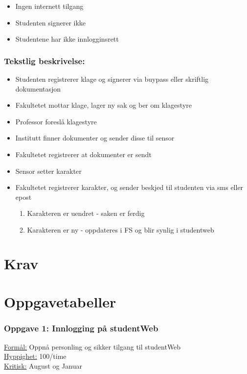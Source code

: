 \documentclass[12pt]{article}
\begin{document}
\begin{itemize}
\item Ingen internett tilgang
\item Studenten signerer ikke
\item Studentene har ikke innlogginsrett
\end{itemize}

\subsubsection*{Tekstlig beskrivelse:}

\begin{itemize}
\item Studenten registrerer klage og signerer via buypass eller skriftlig dokumentasjon
\item Fakultetet mottar klage, lager ny sak og ber om klagestyre
\item Professor foreslå klagestyre
\item Institutt finner dokumenter og sender disse til sensor
\item Fakultetet registrerer at dokumenter er sendt
\item Sensor setter karakter
\item Fakultetet registrerer karakter, og sender beskjed til studenten via sms eller epost
\begin{enumerate}
\item Karakteren er uendret - saken er ferdig
\item Karakteren er ny - oppdateres i FS og blir synlig i studentweb
\end{enumerate}
\end{itemize}


\section{Krav}

\section{Oppgavetabeller}

\subsubsection*{Oppgave 1: Innlogging på studentWeb}

\underline{Formål:} Oppnå personling og sikker tilgang til studentWeb\\
\underline{Hyppighet:} 100/time\\
\underline{Kritisk:} August og Januar
\end{document}
